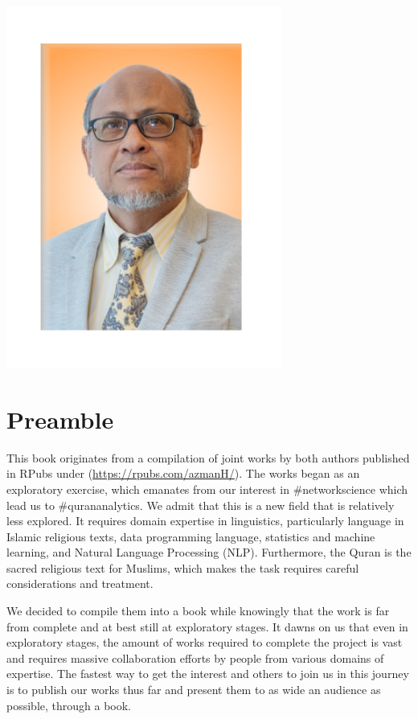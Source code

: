\documentclass[
]{article}
\begin{document}
\begin{center}\includegraphics{00-index_files/figure-latex/unnamed-chunk-4-1} \end{center}

\hypertarget{preamble}{%
\section*{Preamble}\label{preamble}}

This book originates from a compilation of joint works by both authors published in RPubs under (\url{https://rpubs.com/azmanH/}). The works began as an exploratory exercise, which emanates from our interest in \#networkscience which lead us to \#qurananalytics. We admit that this is a new field that is relatively less explored. It requires domain expertise in linguistics, particularly language in Islamic religious texts, data programming language, statistics and machine learning, and Natural Language Processing (NLP). Furthermore, the Quran is the sacred religious text for Muslims, which makes the task requires careful considerations and treatment.

We decided to compile them into a book while knowingly that the work is far from complete and at best still at exploratory stages. It dawns on us that even in exploratory stages, the amount of works required to complete the project is vast and requires massive collaboration efforts by people from various domains of expertise. The fastest way to get the interest and others to join us in this journey is to publish our works thus far and present them to as wide an audience as possible, through a book.
\end{document}
